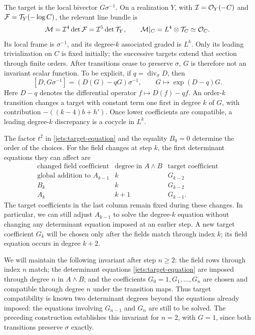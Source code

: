 The target is the local bivector $G\sigma^{-1}$.  On a realization $Y$,
with $\mathcal I=\mathcal O_Y(-C)$ and $\mathcal F=\mathcal T_Y(-\log C)$, the relevant line bundle is
\[
 \mathcal M=\mathcal I^4\det\mathcal F=\mathcal I^5\det\mathcal T_Y,
 \qquad \mathcal M|_C=L^4\otimes\mathcal T_C\simeq\mathcal O_C.
\]
Its local frame is $\sigma^{-1}$, and its degree-$k$ associated graded
is $L^k$.  Only its leading trivialization on $C$ is fixed initially;
the successive targets extend that section through finite orders.
After transitions cease to preserve $\sigma$, $G$ is therefore not
an invariant scalar function.  To be explicit, if
$q=\operatorname{div}_{\sigma}D$, then
\begin{equation}\label{jets:target-transport}
 [D,G\sigma^{-1}]=(D(G)-qG)\sigma^{-1},\qquad
 G\longmapsto\exp(D-q)G.
\end{equation}
Here $D-q$ denotes the differential operator $f\mapsto D(f)-qf$.
An order-$k$ transition changes a target with constant term one first
in degree $k$ of $G$, with contribution
$-((k-4)b+h')$.  Once lower coefficients are compatible, a leading
degree-$k$ discrepancy is a cocycle in $L^k$.

The factor $t^2$ in \eqref{jets:target-equation} and the equality
$B_0=0$ determine the order of the choices.  For the field changes
at step $k$, the first determinant equations they can affect are
\[
\begin{array}{c|c|c}
 \text{changed field coefficient}
 &\text{degree in }A\wedge B&\text{target coefficient}\\ \hline
 \text{global addition to }A_{k-1}&k&G_{k-2}\\
 B_k&k&G_{k-2}\\
 A_k&k+1&G_{k-1}.
\end{array}
\]
The target coefficients in the last column remain fixed during these
changes.  In particular, we can still adjust $A_{k-1}$ to solve the
degree-$k$ equation without changing any determinant equation imposed
at an earlier step.  A new target coefficient $G_k$ will be chosen
only after the fields match through index $k$; its field equation
occurs in degree $k+2$.

We will maintain the following invariant after step $n\geq2$:
the field rows through index $n$ match; the determinant equations
\eqref{jets:target-equation} are imposed through degree $n$ in
$A\wedge B$; and the coefficients $G_0=1,G_1,\ldots,G_n$ are chosen
and compatible through degree $n$ under the transition maps.
Thus target compatibility is known two determinant degrees beyond
the equations already imposed: the equations involving $G_{n-1}$
and $G_n$ are still to be solved.
The preceding construction establishes this invariant for $n=2$,
with $G=1$, since both transitions preserve $\sigma$ exactly.

